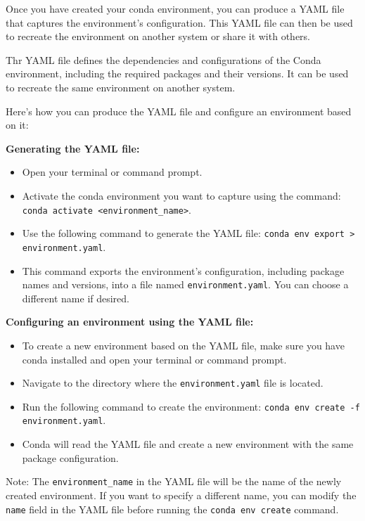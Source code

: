 Once you have created your conda environment, you can produce a YAML file that captures the environment's configuration. This YAML file can then be used to recreate the environment on another system or share it with others. 

Thr YAML file defines the dependencies and configurations of the Conda environment, including the required packages and their versions. It can be used to recreate the same environment on another system.

Here's how you can produce the YAML file and configure an environment based on it:

\textbf{Generating the YAML file:}

\begin{itemize}
	\item Open your terminal or command prompt.
	\item Activate the conda environment you want to capture using the command: \texttt{conda activate <environment\_name>}.
	\item Use the following command to generate the YAML file: \texttt{conda env export > environment.yaml}.
	\item This command exports the environment's configuration, including package names and versions, into a file named \texttt{environment.yaml}. You can choose a different name if desired.
\end{itemize}

\textbf{Configuring an environment using the YAML file:}

\begin{itemize}
	\item To create a new environment based on the YAML file, make sure you have conda installed and open your terminal or command prompt.
	\item Navigate to the directory where the \texttt{environment.yaml} file is located.
	\item Run the following command to create the environment: \texttt{conda env create -f environment.yaml}.
	\item Conda will read the YAML file and create a new environment with the same package configuration.
\end{itemize}

Note: The \texttt{environment\_name} in the YAML file will be the name of the newly created environment. If you want to specify a different name, you can modify the \texttt{name} field in the YAML file before running the \texttt{conda env create} command.



